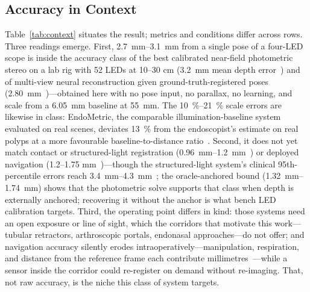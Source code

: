\documentclass[conference]{IEEEtran}
\begin{document}
\subsection{Accuracy in Context}\label{sub:context}
Table~\ref{tab:context} situates the result; metrics and conditions
differ across rows.  Three readings emerge.  First, \SIrange{2.7}{3.1}{\milli\meter} from a single
pose of a four-LED scope is inside the accuracy class of the best
calibrated near-field photometric stereo on a lab rig with 52 LEDs at
10--30 cm (\SI{3.2}{\milli\meter} mean depth error~\cite{mecca2021luces})
and of multi-view neural reconstruction given ground-truth-registered
poses (\SI{2.80}{\milli\meter}~\cite{batlle2023lightneus})---obtained
here with no pose input, no parallax, no learning, and scale from a
\SI{6.05}{\milli\meter} baseline at \SI{55}{\milli\meter}.  The
\SIrange{10}{21}{\percent} scale errors are likewise in class:
EndoMetric, the comparable illumination-baseline system evaluated on
real scenes, deviates \SI{13}{\percent} from the endoscopist's estimate
on real polyps at a more favourable baseline-to-distance
ratio~\cite{iranzo2025endometric}.  Second, it
does not yet match contact or structured-light registration
(\SIrange{0.96}{1.2}{\milli\meter}~\cite{tamura2005,jakubovic2018}) or
deployed navigation (1.2--1.75 mm~\cite{guha2017})---though the
structured-light system's clinical 95th-percentile errors reach
\SIrange{3.4}{4.3}{\milli\meter}~\cite{jakubovic2018}; the oracle-anchored
bound (\SIrange{1.32}{1.74}{\milli\meter}) shows that the photometric
solve supports that class when depth is externally anchored; recovering
it without the anchor is what bench LED calibration targets.  Third, the operating point differs in kind: those systems need an open
exposure or line of sight, which the corridors that motivate this
work---tubular retractors, arthroscopic portals, endonasal
approaches---do not offer; and navigation accuracy silently erodes
intraoperatively---manipulation, respiration, and distance from the
reference frame each contribute millimetres~\cite{guha2019}---while a
sensor inside the corridor could re-register on demand without
re-imaging.  That, not raw accuracy, is the niche this class of system
targets.
\end{document}
